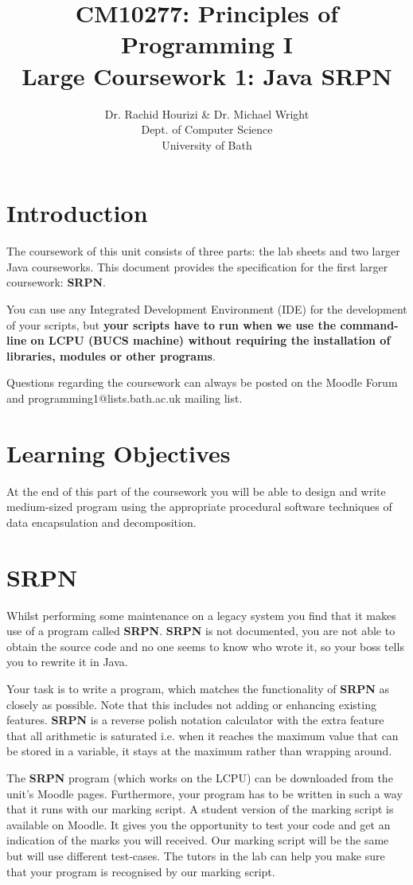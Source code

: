 \documentclass[12pt, oneside]{article}   	%
\title{CM10277: Principles of Programming I \\ Large Coursework 1: Java SRPN}
\author{Dr. Rachid Hourizi \& Dr. Michael Wright \\ Dept. of Computer Science \\ University of Bath}
\date{}							%
\begin{document}
\maketitle
\section{Introduction}
The coursework of this unit consists of three parts: the lab sheets and two larger Java courseworks. This document provides the specification for the first larger coursework: \textbf{SRPN}.

You can use any Integrated Development Environment (IDE) for the development of your scripts, but \textbf{your scripts have to run when we use the command-line on LCPU (BUCS machine) without requiring the installation of libraries, modules or other programs}.

Questions regarding the coursework can always be posted on the Moodle Forum and programming1@lists.bath.ac.uk mailing list.

\section{Learning Objectives}
At the end of this part of the coursework you will be able to design and write medium-sized program using the appropriate procedural software techniques of data encapsulation and decomposition.

\clearpage
\section{SRPN}
Whilst performing some maintenance on a legacy system you find that it makes use of a program called \textbf{SRPN}. \textbf{SRPN} is not documented, you are not able to obtain the source code and no one seems to know who wrote it, so your boss tells you to rewrite it in Java. 

Your task is to write a program, which matches the functionality of \textbf{SRPN} as closely as possible.  Note that this includes not adding or enhancing existing features.  \textbf{SRPN} is a reverse polish notation calculator with the extra feature that all arithmetic is saturated i.e. when it reaches the maximum value that can be stored in a variable, it stays at the maximum rather than wrapping around.

\bigskip

The \textbf{SRPN} program (which works on the LCPU) can be downloaded from the unit's Moodle pages.  Furthermore, your program has to be written in such a way that it runs with our marking script. A student version of the marking script is available on Moodle. It gives you the opportunity to test your code and get an indication of the marks you will received. Our marking script will be the same but will use different test-cases. The tutors in the lab can help you make sure that your program is recognised by our marking script.
\end{document}
